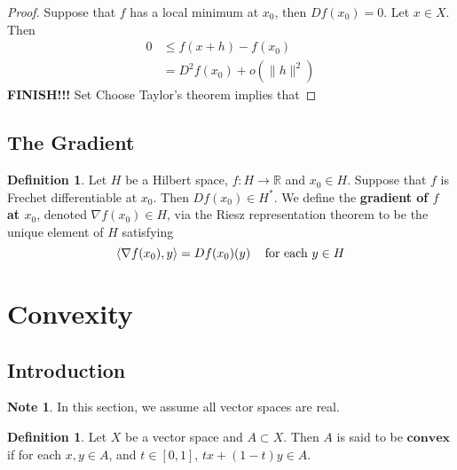 \documentclass[12pt]{amsart}
\theoremstyle{definition}
\newtheorem{defn}[definition]{Definition}
\newtheorem{note}[definition]{Note}
\newcommand{\R}{\mathbb{R}}
\renewcommand{\r}{\rangle}
\renewcommand{\l}{\langle}
\newcommand{\ld}[1]{\label{defn:#1}}
\begin{document}
	\begin{proof}
	Suppose that $f$ has a local minimum at $x_0$, then $Df(x_0) = 0$. Let $x \in X$. Then 
	\begin{align*}
	0 
	& \leq f(x+h) - f(x_0) \\
	&= D^2f(x_0) +o(\|h\|^2)
	\end{align*}
	\textbf{FINISH!!!}
	 Set Choose Taylor's theorem implies that 
	\end{proof}

	
	
	
	
	
	\newpage
	\subsection{The Gradient}
	
	\begin{defn} \ld{}
	Let $H$ be a Hilbert space, $f: H \rightarrow \R$ and $x_0 \in H$. Suppose that $f$ is Frechet differentiable at $x_0$. Then $Df(x_0) \in H^*$. We define the \textbf{gradient of $f$ at $x_0$}, denoted $\nabla f(x_0) \in H$, via the Riesz representation theorem to be the unique element of $H$ satisfying $$\l \nabla f(x_0), y \r = Df(x_0)(y) \hspace{.3cm} \text{ for each } y \in H$$
	\end{defn}
	
	
	
	
	
	
	
	
	
	
	

	
	
	
	
	
	
	\newpage
	\section{Convexity}
	
	\subsection{Introduction}

	\begin{note}
	In this section, we assume all vector spaces are real.
	\end{note}

	\begin{defn} \ld{}
	Let $X$ be a vector space and $A \subset X$. Then $A$ is said to be $\textbf{convex}$ if for each $x, y \in A$, and $t \in [0,1]$,  $tx + (1-t)y \in A$. 
	\end{defn}	
	
\end{document}
